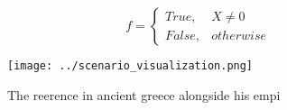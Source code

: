 \documentclass[a4paper]{article}
\begin{document}
\begin{equation}   f =
\begin{cases} True, & X \neq 0\\
False, & otherwise
\end{cases}
\end{equation}

\begin{figure}
\centering
\texttt{[image: ../scenario\_visualization.png]}
\caption{The reerence in ancient greece alongside his empi
}
\end{figure}
 
\end{document}
